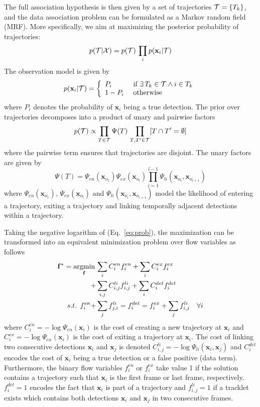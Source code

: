 \documentclass[10pt,twocolumn,letterpaper]{article}
\DeclareMathOperator*{\argmin}{argmin}
\newcommand{\bx}{\mathbf{x}}
\newcommand{\bff}{\mathbf{f}}
\newcommand{\cT}{{\cal T}}
\renewcommand{\eqref}[1]{Eq.~\ref{#1}}
\begin{document}
The full association hypothesis is then given by a set of trajectories ${\cal T} = \{T_k\}$, and the 
 data association problem can be formulated as a Markov random field (MRF). More specifically, we aim at maximizing the posterior probability of trajectories:
\begin{equation}
p({\cal T}|{\cal X})  = p(\cT) \, \prod_i p(\bx_i|{\cal T}) 
\label{eq:prob}
\end{equation}
The observation model is given by
\begin{equation}
p(\bx_i|{\cal T})  = \left\{
\begin{array}{ll}
P_i &\mbox{ if $\exists \,T_k \in {\cal T} \land i \in T_k$} \\
1-P_i &\mbox{ otherwise}
\end{array} \right.
\end{equation}
where $P_i$ denotes the probability of $\bx_i$ being a true detection. The prior over trajectories decomposes into a product of unary and pairwise factors
\begin{equation}
p({\cal T}) \propto \prod_{T \in {\cal T}} \Psi(T) \, \prod_{T,T' \in {\cal T}} [T \cap T' = \emptyset]
\end{equation}
where the pairwise term ensures that trajectories are disjoint. The unary factors are given by
\begin{equation}
\Psi(T) = \Psi_{en}(\bx_{o_1}) \Psi_{ex}(\bx_{o_l}) \prod_{i=1}^{l-1} \Psi_{li}(\bx_{o_i},\bx_{o_{i+1}})
\end{equation}
where $\Psi_{en}(\bx_{o_1})$, $\Psi_{ex}(\bx_{o_l})$ and $\Psi_{li}(\bx_{o_i},\bx_{o_{i+1}})$  model the likelihood of entering a trajectory, exiting a trajectory and linking  temporally adjacent  detections within a trajectory.

Taking the negative logarithm of (\eqref{eq:prob}), the maximization can be transformed into an equivalent minimization problem over flow variables \cite{Zhang2008CVPR} as follows 
 \begin{align}
{\cal \bff}^* = \argmin_{ \bff}\,
   &\sum_i C^{en}_{i} f^{en}_i + \sum_i C^{ex}_i f^{ex}_i \nonumber \\ + &  \sum_{i,j} C^{li}_{i,j} f^{li}_{i,j} + \sum_i C^{det}_{i} f^{det}_{i} \nonumber \\
  s.t. \;\, f^{en}_i + &\sum_j f^{li}_{j,i} = f^{det}_i = f^{ex}_i + \sum_j f^{li}_{i,j} \quad \forall i
  \label{eq:flow}
 \end{align}
where $C^{en}_i = -\log\Psi_{en}(\bx_i)$ is the cost of creating a new trajectory at $\bx_i$ and  $C^{ex}_i=-\log \Psi_{ex}(\bx_i)$ is the cost of exiting a trajectory at $\bx_i$. The cost of linking two consecutive  detections $\bx_i$ and $\bx_j$ is denoted $C^{li}_{i,j} = -\log \Psi_{li}(\bx_i,\bx_j)$ and $C^{det}_i$ encodes the cost of $\bx_i$  being a true detection or a false positive (data term). 
Furthermore, the binary flow variables $f^{en}_i$ or $f^{ex}_i$ take value 1 if the solution contains a trajectory such that $\bx_i$ is the first frame or last frame, respectively. $f^{det}_i=1$ encodes the fact that $\bx_i$ is part of a trajectory and $f^{li}_{i,j}=1$ if a tracklet exists which contains both detections $\bx_i$ and $\bx_j$ in two consecutive frames. 
\end{document}
